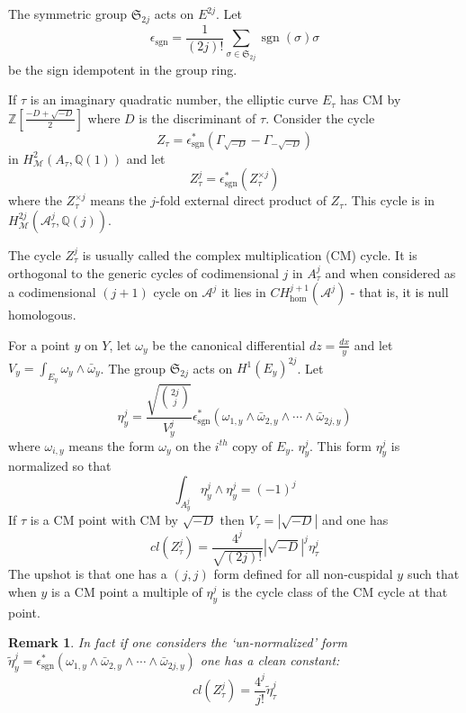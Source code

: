 \documentclass[11pt,a4paper]{article}
\newtheorem{rem}[defn]{Remark}
\newcommand {\ZZ}{{\mathds Z}}
\newcommand {\A}{{\mathcal A}}
\newcommand {\Q}{{\mathds Q}}
\newcommand {\M}{{\mathcal M}}
\newcommand {\MS}{{{\mathfrak S}}}
\def\sgn{\operatorname{sgn}}
\newcommand {\es}{{\epsilon^*_{\sgn}}}
\begin{document}
The symmetric group $\MS_{2j}$ acts on $E^{2j}$. Let 
%
$$\epsilon_{\sgn}=\frac{1}{(2j)!} \sum_{\sigma \in \MS_{2j}} \sgn(\sigma)\sigma$$ 
%
be the sign idempotent in the group ring. 


If $\tau$ is an imaginary quadratic number,  the elliptic curve  $E_{\tau}$ has CM by $\ZZ[\frac{-D+\sqrt{-D}}{2}]$ where $D$ is the discriminant of $\tau$. Consider the cycle 
%
$$Z_{\tau}=\es(\Gamma_{\sqrt{-D}}-\Gamma_{-\sqrt{-D}})$$
%
in $H^2_{\M}(A_{\tau},\Q(1))$ and let 
%
$$Z^j_{\tau}=\es \left(Z_{\tau}^{\times j}\right)$$
%
where the $Z_{\tau}^{\times j}$ means the $j$-fold external direct product of $Z_{\tau}$. This cycle is in $H^{2j}_{\M}(\A^j_{\tau},\Q(j))$.

The cycle $Z_{\tau}^j$ is usually called the complex multiplication (CM) cycle. It is orthogonal to the generic cycles of codimensional $j$ in $A_{\tau}^j$ and when considered as a codimensional $(j+1)$ cycle on $\A^j$ it lies in $CH^{j+1}_{\hom}(\A^j)$ - that is, it is null homologous. 

For a point $y$  on $Y$, let $\omega_y$ be the canonical differential $dz=\frac{dx}{y}$ and let $V_y=\int_{E_y} \omega_y \wedge \bar{\omega}_y$.  The group $\MS_{2j}$ acts on $H^1(E_y)^{2j}$. Let 
%
$$\eta^j_y= \frac{\sqrt{\binom{2j}{j}}}{V_y^j}  \es(\omega_{1,y}\wedge \bar{\omega}_{2,y}\wedge \cdots \wedge \bar{\omega}_{2j,y})$$
%
where $\omega_{i,y}$ means the form $\omega_y$ on the $i^{th}$ copy of $E_y$. $\eta^j_y$. This form $\eta^j_y$ is normalized so that 
%
$$\int_{A_y^j} \eta^j_y \wedge \eta^j_y=(-1)^j$$ 
%
If $\tau$ is a CM point with CM by $\sqrt{-D}$ then $V_{\tau}=|\sqrt{-D}|$ and one has 
%
$$cl(Z^j_{\tau})=\frac{4^j}{\sqrt{(2j)!}} |\sqrt{-D}|^j \eta^j_{\tau}$$
%
The upshot is that one has a $(j,j)$ form defined for all non-cuspidal $y$ such that when $y$ is a CM point a multiple of  $\eta^j_y$ is the cycle class of the CM cycle at that point. 

\begin{rem} In fact if one considers the `un-normalized' form $\tilde{\eta}^j_y=\es(\omega_{1,y}\wedge \bar{\omega}_{2,y}\wedge \cdots \wedge \bar{\omega}_{2j,y})$ one has a clean constant:
%
	$$cl(Z^j_{\tau})=\frac{4^j}{j!} \tilde{\eta}^j_{\tau}$$
	
	
	
	
	\end{rem}
\end{document}
